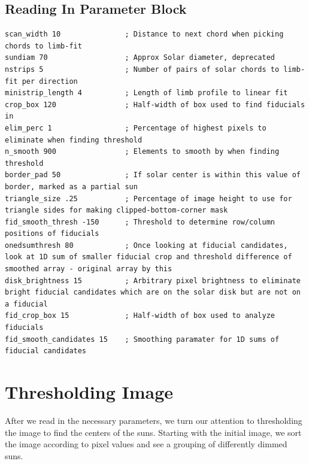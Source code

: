 \documentclass[10pt]{scrartcl}
\begin{document}
\newpage

\subsection{Reading In Parameter Block} %
\label{sub:reading_in_parameter_block}

\begin{lstlisting}
scan_width 10               ; Distance to next chord when picking chords to limb-fit
sundiam 70                  ; Approx Solar diameter, deprecated
nstrips 5                   ; Number of pairs of solar chords to limb-fit per direction
ministrip_length 4          ; Length of limb profile to linear fit
crop_box 120                ; Half-width of box used to find fiducials in
elim_perc 1                 ; Percentage of highest pixels to eliminate when finding threshold
n_smooth 900                ; Elements to smooth by when finding threshold 
border_pad 50               ; If solar center is within this value of border, marked as a partial sun
triangle_size .25           ; Percentage of image height to use for triangle sides for making clipped-bottom-corner mask
fid_smooth_thresh -150      ; Threshold to determine row/column positions of fiducials
onedsumthresh 80            ; Once looking at fiducial candidates, look at 1D sum of smaller fiducial crop and threshold difference of smoothed array - original array by this
disk_brightness 15          ; Arbitrary pixel brightness to eliminate bright fiducial candidates which are on the solar disk but are not on a fiducial
fid_crop_box 15             ; Half-width of box used to analyze fiducials
fid_smooth_candidates 15    ; Smoothing paramater for 1D sums of fiducial candidates 

\end{lstlisting}

\section{Thresholding Image} %
\label{sec:thresholding_image}

After we read in the necessary parameters, we turn our attention to thresholding the image to find the centers of the suns. Starting with the initial image, we sort the image according to pixel values and see a grouping of differently dimmed suns. 
\end{document}
